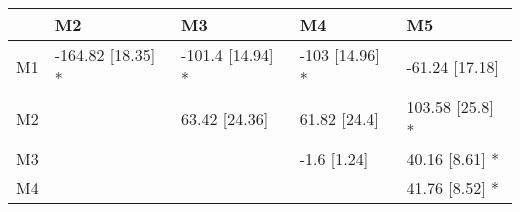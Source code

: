 \begin{table}[ht]
\centering
\begin{tabular}{rllll}
  \hline
 & M2 & M3 & M4 & M5 \\ 
  \hline
M1 & -164.82 [18.35] * & -101.4 [14.94] * & -103 [14.96] * & -61.24 [17.18] \\ 
  M2 &  & 63.42 [24.36] & 61.82 [24.4] & 103.58 [25.8] * \\ 
  M3 &  &  & -1.6 [1.24] & 40.16 [8.61] * \\ 
  M4 &  &  &  & 41.76 [8.52] * \\ 
   \hline
\end{tabular}
\end{table}
